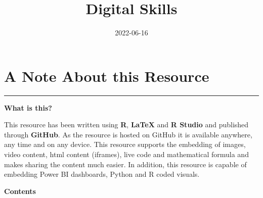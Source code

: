 \documentclass[
]{book}
\title{Digital Skills}
\author{}
\date{\vspace{-2.5em}2022-06-16}
\begin{document}
\maketitle

{
\setcounter{tocdepth}{1}
\tableofcontents
}
\hypertarget{A-Note-About-this-Resource}{%
\chapter*{A Note About this Resource}\label{A-Note-About-this-Resource}}

\begin{center}\rule{0.5\linewidth}{0.5pt}\end{center}

\textbf{What is this?}

This resource has been written using \textbf{R}, \textbf{LaTeX} and \textbf{R Studio} and published through \textbf{GitHub}. As the resource is hosted on GitHub it is available anywhere, any time and on any device. This resource supports the embedding of images, video content, html content (iframes), live code and mathematical formula and makes sharing the content much easier. In addition, this resource is capable of embedding Power BI dashboards, Python and R coded visuals.

\textbf{Contents}
\end{document}
